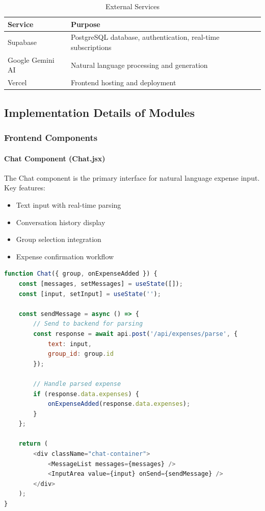 \begin{table}[H]
\centering
\caption{External Services}
\label{tab:services}
\begin{tabular}{|p{4cm}|p{9cm}|}
\hline
\textbf{Service} & \textbf{Purpose} \\
\hline
Supabase & PostgreSQL database, authentication, real-time subscriptions \\
\hline
Google Gemini AI & Natural language processing and generation \\
\hline
Vercel & Frontend hosting and deployment \\
\hline
\end{tabular}
\end{table}

\subsection{Implementation Details of Modules}

\subsubsection{Frontend Components}

\paragraph{Chat Component (Chat.jsx)}

The Chat component is the primary interface for natural language expense input. Key features:

\begin{itemize}
    \item Text input with real-time parsing
    \item Conversation history display
    \item Group selection integration
    \item Expense confirmation workflow
\end{itemize}

\begin{lstlisting}[language=JavaScript, caption=Chat Component Structure]
function Chat({ group, onExpenseAdded }) {
    const [messages, setMessages] = useState([]);
    const [input, setInput] = useState('');
    
    const sendMessage = async () => {
        // Send to backend for parsing
        const response = await api.post('/api/expenses/parse', {
            text: input,
            group_id: group.id
        });
        
        // Handle parsed expense
        if (response.data.expenses) {
            onExpenseAdded(response.data.expenses);
        }
    };
    
    return (
        <div className="chat-container">
            <MessageList messages={messages} />
            <InputArea value={input} onSend={sendMessage} />
        </div>
    );
}
\end{lstlisting}


